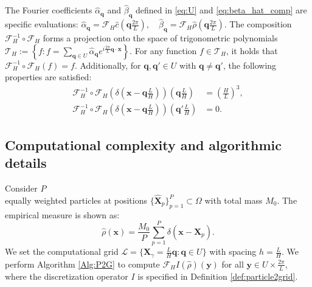 \documentclass[review,onefignum,onetabnum]{siamart250211}
\begin{document}
The Fourier coefficients \(\hat{\alpha}_{\mathbf{q}}\) and \(\hat{\beta}_{\mathbf{q}}\) defined in \eqref{eq:U} and \eqref{eq:beta_hat_comp} are specific evaluations:
\(
\hat{\alpha}_{\mathbf{q}} = \mathcal{F}_H \hat{c}\left(\mathbf{q}\frac{2\pi}{L}\right), \quad 
\hat{\beta}_{\mathbf{q}} = \mathcal{F}_H \hat{\rho}\left(\mathbf{q}\frac{2\pi}{L}\right).
\)
The composition \(\mathcal{F}_H^{-1} \circ \mathcal{F}_H\) forms a projection onto the space of trigonometric polynomials \(\mathcal{T}_H:= \left\{ f : f = \sum_{\mathbf{q} \in U} \hat{\alpha}_{\mathbf{q}} e^{i \frac{2\pi}{L} \mathbf{q} \cdot \mathbf{x}} \right\}\). For any function \( f \in \mathcal{T}_H \), it holds that
\(
\mathcal{F}_H^{-1} \circ \mathcal{F}_H (f) = f.
\)
Additionally, for \(\mathbf{q}, \mathbf{q'} \in U\) with \(\mathbf{q} \neq \mathbf{q'}\), the following properties are satisfied:
\begin{equation}
  \begin{aligned}
    \mathcal{F}_H^{-1} \circ \mathcal{F}_H \left(\delta \left(\mathbf{x}-\mathbf{q} \frac{L}{H} \right) \right) \left(\mathbf{q} \frac{L}{H} \right) &= \left( \frac{H}{L} \right)^3, \\
    \mathcal{F}_H^{-1} \circ \mathcal{F}_H \left(\delta \left(\mathbf{x}-\mathbf{q} \frac{L}{H} \right) \right) \left(\mathbf{q'} \frac{L}{H} \right) &= 0.
  \end{aligned}
\end{equation}

\subsection{Computational complexity and algorithmic details}
\label{subsec:complexity}
Consider \( P \)\\ equally weighted particles at positions \( \{\widehat{\mathbf{X}}_p\}_{p=1}^P \subset \Omega\) with total mass $M_0$. The empirical measure is shown as:
\begin{equation}
    \label{eq:emp_measure}
    \hat{\rho}(\mathbf{x}) = \frac{M_0}{P}\sum_{p=1}^P \delta(\mathbf{x} - \widehat{\mathbf{X}}_p).
\end{equation}
We set the computational grid \( \mathcal{L} = \{\mathbf{X}_\gamma = \frac{L}{H} \mathbf{q} : \mathbf{q}  \in U\} \) with spacing \( h = \frac{L}{H} \). We perform Algorithm \ref{Alg:P2G} to compute \( \mathcal{F}_H I(\hat{\rho})(\mathbf{y}) \) for all \( \mathbf{y} \in U \times \frac{2\pi}{L} \), where the discretization operator $I$ is specified in Definition \ref{def:particle2grid}.
\end{document}
